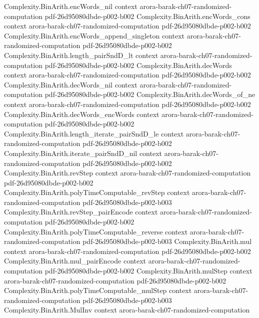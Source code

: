 \begin{theorem}
\proofstep
  {Complexity.BinArith.encWords_nil}
  {context}
  {arora-barak-ch07-randomized-computation}
  {pdf-26d95080dbde-p002-b002}
\proofstep
  {Complexity.BinArith.encWords_cons}
  {context}
  {arora-barak-ch07-randomized-computation}
  {pdf-26d95080dbde-p002-b002}
\proofstep
  {Complexity.BinArith.encWords_append_singleton}
  {context}
  {arora-barak-ch07-randomized-computation}
  {pdf-26d95080dbde-p002-b002}
\proofstep
  {Complexity.BinArith.length_pairSndD_lt}
  {context}
  {arora-barak-ch07-randomized-computation}
  {pdf-26d95080dbde-p002-b002}
\proofstep
  {Complexity.BinArith.decWords}
  {context}
  {arora-barak-ch07-randomized-computation}
  {pdf-26d95080dbde-p002-b002}
\proofstep
  {Complexity.BinArith.decWords_nil}
  {context}
  {arora-barak-ch07-randomized-computation}
  {pdf-26d95080dbde-p002-b002}
\proofstep
  {Complexity.BinArith.decWords_of_ne}
  {context}
  {arora-barak-ch07-randomized-computation}
  {pdf-26d95080dbde-p002-b002}
\proofstep
  {Complexity.BinArith.decWords_encWords}
  {context}
  {arora-barak-ch07-randomized-computation}
  {pdf-26d95080dbde-p002-b002}
\proofstep
  {Complexity.BinArith.length_iterate_pairSndD_le}
  {context}
  {arora-barak-ch07-randomized-computation}
  {pdf-26d95080dbde-p002-b002}
\proofstep
  {Complexity.BinArith.iterate_pairSndD_nil}
  {context}
  {arora-barak-ch07-randomized-computation}
  {pdf-26d95080dbde-p002-b002}
\proofstep
  {Complexity.BinArith.revStep}
  {context}
  {arora-barak-ch07-randomized-computation}
  {pdf-26d95080dbde-p002-b002}
\proofstep
  {Complexity.BinArith.polyTimeComputable_revStep}
  {context}
  {arora-barak-ch07-randomized-computation}
  {pdf-26d95080dbde-p002-b003}
\proofstep
  {Complexity.BinArith.revStep_pairEncode}
  {context}
  {arora-barak-ch07-randomized-computation}
  {pdf-26d95080dbde-p002-b002}
\proofstep
  {Complexity.BinArith.polyTimeComputable_reverse}
  {context}
  {arora-barak-ch07-randomized-computation}
  {pdf-26d95080dbde-p002-b003}
\proofstep
  {Complexity.BinArith.mul}
  {context}
  {arora-barak-ch07-randomized-computation}
  {pdf-26d95080dbde-p002-b002}
\proofstep
  {Complexity.BinArith.mul_pairEncode}
  {context}
  {arora-barak-ch07-randomized-computation}
  {pdf-26d95080dbde-p002-b002}
\proofstep
  {Complexity.BinArith.mulStep}
  {context}
  {arora-barak-ch07-randomized-computation}
  {pdf-26d95080dbde-p002-b002}
\proofstep
  {Complexity.BinArith.polyTimeComputable_mulStep}
  {context}
  {arora-barak-ch07-randomized-computation}
  {pdf-26d95080dbde-p002-b003}
\proofstep
  {Complexity.BinArith.MulInv}
  {context}
  {arora-barak-ch07-randomized-computation}

\end{theorem}
